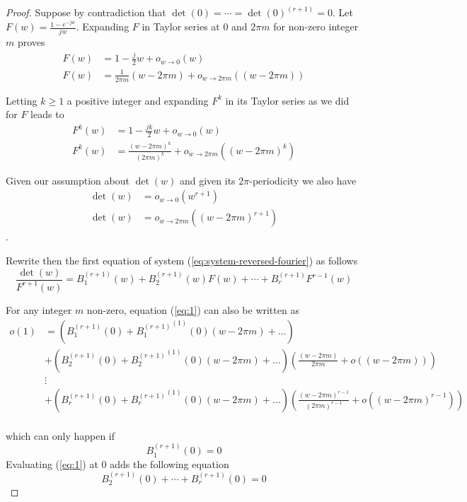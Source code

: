 \documentclass[a4paper, 11pt]{article}
\begin{document}
\begin{proof}
  Suppose by contradiction that $\det(0) = \cdots = {\det(0)}^{(r+1)} = 0$.   Let $F(w) = \frac{1-e^{-jw}}{jw}$.  
  Expanding $F$ in Taylor series at $0$ and $2\pi m$ for non-zero integer $m$ proves
  \begin{align*}
    F(w) &= 1 - \frac{j}{2}w + o_{w \to 0}(w) \\
    F(w) &= \frac{1}{2\pi m}(w-2\pi m) + o_{w \to 2\pi m}((w-2\pi m))
  \end{align*}

  Letting $k \geq 1$ a positive integer and expanding $F^k$ in its Taylor series as we did for $F$ leads to
  \begin{align*}
    F^k(w) &= 1 - \frac{jk}{2}w + o_{w \to 0}(w) \\
    F^k(w) &= \frac{{(w-2\pi m)}^{k}}{{(2\pi m)}^k} + o_{w \to 2\pi m}\left({(w-2\pi m)}^k\right)
  \end{align*}

  Given our assumption about $\det(w)$ and given its $2\pi$-periodicity we also have
  \begin{align*}
    \det(w) &= o_{w \to 0}(w^{r+1}) \\
    \det(w) &= o_{w \to 2\pi m}\left({(w-2\pi m)}^{r+1}\right)
  \end{align*}. 

  Rewrite then the first equation of system (\ref{eq:system-reversed-fourier}) as follows
  \begin{equation}\label{eq:1}
    \frac{\det(w)}{F^{r+1}(w)} = B_1^{(r+1)}(w) + B_2^{(r+1)}(w) F(w) + \cdots + B_r^{(r+1)} F^{r-1}(w)
  \end{equation}

  For any integer $m$ non-zero, equation (\ref{eq:1}) can also be written as
  \begin{align*}
    o(1) &= \left(B_1^{(r+1)}(0) + {B_1^{(r+1)}}^{(1)}(0)(w-2\pi m) + \ldots \right) \\
    & + \left(B_2^{(r+1)}(0) + {B_2^{(r+1)}}^{(1)}(0){(w-2\pi m)} + \ldots \right) \left(\frac{(w-2\pi m)}{2\pi m}  + 
    o({(w-2\pi m)})\right) \\
      &\vdots \\
    & + \left(B_r^{(r+1)}(0) + {B_r^{(r+1)}}^{(1)}(0){(w-2\pi m)} + \ldots \right) \left(\frac{{(w-2\pi 
    m)}^{r-1}}{{(2\pi m)}^{r-1}} + o({(w-2\pi m)}^{r-1})\right) \\
  \end{align*}
    
  which can only happen if
  \begin{equation}
    B_1^{(r+1)}(0) = 0 
  \end{equation}
  Evaluating (\ref{eq:1}) at $0$ adds the following equation
  \begin{equation}
    B_2^{(r+1)}(0) + \cdots + B_r^{(r+1)}(0) = 0
  \end{equation}
    

\end{proof}
\end{document}
